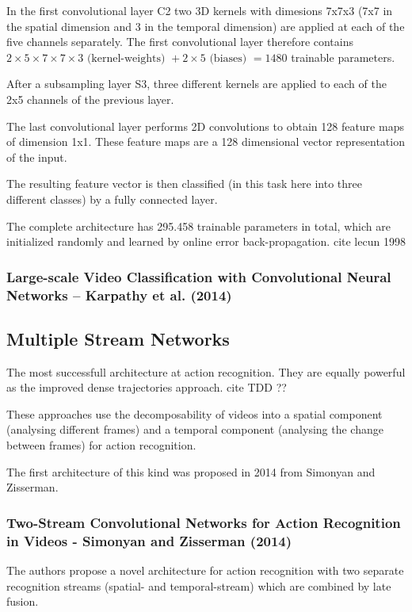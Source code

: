 In the first convolutional layer C2 two 3D kernels with dimesions 7x7x3 (7x7 in the spatial dimension and 3 in the temporal dimension) are applied at each of the five channels separately. 
The first convolutional layer therefore contains $2 \times 5 \times 7 \times 7 \times 3 \text{ (kernel-weights) } + 2 \times 5 \text{ (biases) } = 1480$ trainable parameters. 

After a subsampling layer S3, three different kernels are applied to each of the 2x5 channels of the previous layer.

The last convolutional layer performs 2D convolutions to obtain 128 feature maps of dimension 1x1.
These feature maps are a 128 dimensional vector representation of the input.

The resulting feature vector is then classified (in this task here into three different classes) by a fully connected layer.

The complete architecture has 295.458 trainable parameters in total, which are initialized randomly and learned by online error back-propagation. cite lecun 1998



\subsubsection{Large-scale Video Classification with Convolutional Neural Networks -- Karpathy et al. (2014)}

\subsection{Multiple Stream Networks}
The most successfull architecture at action recognition. They are equally powerful as the improved dense trajectories approach. cite TDD ??

These approaches use the decomposability of videos into a spatial component (analysing different frames) and a temporal component (analysing the change between frames) for action recognition.

The first architecture of this kind was proposed in 2014 from Simonyan and Zisserman.

\subsubsection{Two-Stream Convolutional Networks for Action Recognition in Videos - Simonyan and Zisserman (2014)}

The authors propose a novel architecture for action recognition with two separate recognition streams (spatial- and temporal-stream) which are combined by late fusion.

